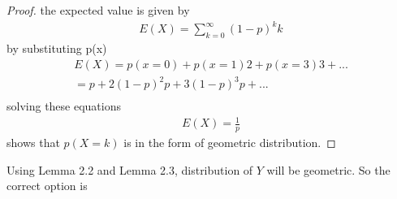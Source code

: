 \documentclass[journal,12pt,twocolumn]{IEEEtran}
\begin{document}
\begin{proof}
the expected value is given by
\begin{align}
E(X) = \sum_{k=0}^{\infty}(1-p)^{k}k
\end{align}
by substituting p(x)
\begin{align}
E(X) = p(x=0)+p(x=1)2+p(x=3)3+...\\
=p+2(1-p)^{2}p+3(1-p)^{3}p+...\nonumber\\
\end{align}
solving these equations
\begin{align}
E(X)=\frac{1}{p}
\end{align}
shows that $p(X=k)$ is in the form of geometric distribution.
\end{proof}
Using Lemma 2.2 and Lemma 2.3, distribution of $Y$ will be geometric.
So the correct option is 
\end{document}
